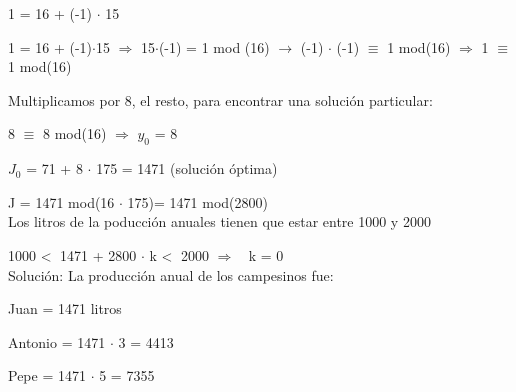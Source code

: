 \documentclass[13pt]{article}
\begin{document}
1 = 16 + (-1) $\cdot$ 15

1 = 16 + (-1)$\cdot$15 $\Rightarrow$ 15$\cdot$(-1) = 1 mod (16) $\rightarrow$ (-1) $\cdot$ (-1) $\equiv$ 1 mod(16) $\Rightarrow$ 1 $\equiv$ 1 mod(16)

Multiplicamos por 8, el resto, para encontrar una solución particular:

8 $\equiv$ 8 mod(16) $\Rightarrow$ $y_{0}$ = 8

$J_{0}$ = 71 + 8 $\cdot$ 175 = 1471 (solución óptima)

J = 1471 mod(16 $\cdot$ 175)= 1471 mod(2800)
\\

Los litros de la poducción anuales tienen que estar entre 1000 y 2000

1000 \textless $\;$ 1471 + 2800 $\cdot$ k \textless $\;$ 2000 $\Rightarrow$ $\;$ k = 0
\\

Solución: La producción anual de los campesinos fue:

Juan = 1471 litros

Antonio = 1471 $\cdot$ 3 = 4413

Pepe = 1471 $\cdot$ 5 = 7355
\end{document}
